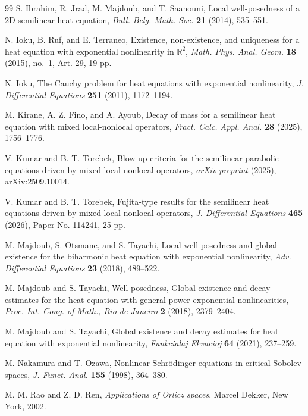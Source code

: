 \documentclass[a4paper,11pt]{amsart}
\numberwithin{equation}{section}
\theoremstyle{plain}
\theoremstyle{definition}
\begin{document}
\begin{thebibliography}{99}
S. Ibrahim, R. Jrad, M. Majdoub, and T. Saanouni,
Local well-posedness of a 2D semilinear heat equation,
\emph{Bull. Belg. Math. Soc.} \textbf{21} (2014), 535--551.

N. Ioku, B. Ruf, and E. Terraneo,
Existence, non-existence, and uniqueness for a heat equation with exponential nonlinearity in $\mathbb{R}^2$,
\emph{Math. Phys. Anal. Geom.} \textbf{18} (2015), no.~1, Art. 29, 19 pp.


N. Ioku,
The Cauchy problem for heat equations with exponential nonlinearity,
\emph{J. Differential Equations} \textbf{251} (2011), 1172--1194.

M. Kirane, A. Z. Fino, and A. Ayoub,
Decay of mass for a semilinear heat equation with mixed local-nonlocal operators,
\emph{Fract. Calc. Appl. Anal.} \textbf{28} (2025), 1756--1776.

V. Kumar and B. T. Torebek,
Blow-up criteria for the semilinear parabolic equations driven by mixed local-nonlocal operators,
\emph{arXiv preprint} (2025), arXiv:2509.10014.

V. Kumar and B. T. Torebek,
Fujita-type results for the semilinear heat equations driven by mixed local-nonlocal operators, \emph{J. Differential Equations} {\bf 465} (2026), Paper No. 114241, 25 pp.

M. Majdoub, S. Otsmane, and S. Tayachi,
Local well-posedness and global existence for the biharmonic heat equation with exponential nonlinearity,
\emph{Adv. Differential Equations} \textbf{23} (2018), 489--522.


     \newblock  M. Majdoub and S. Tayachi, 
         \newblock Well-posedness, Global existence and decay estimates for the heat equation with general power-exponential nonlinearities,
     \newblock \emph{Proc. Int. Cong. of Math., Rio de Janeiro} \textbf{2} (2018), 2379--2404.




M. Majdoub and S. Tayachi,
Global existence and decay estimates for heat equation with exponential nonlinearity,
\emph{Funkcialaj Ekvacioj} \textbf{64} (2021), 237--259.

M. Nakamura and T. Ozawa,
Nonlinear Schr\"odinger equations in critical Sobolev spaces,
\emph{J. Funct. Anal.} \textbf{155} (1998), 364--380.

M. M. Rao and Z. D. Ren,
\emph{Applications of Orlicz spaces},
Marcel Dekker, New York, 2002.


\end{thebibliography}
\end{document}
